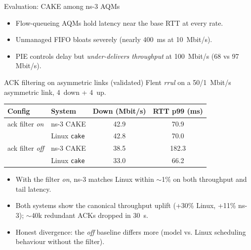 \documentclass[10pt,aspectratio=169]{beamer}
\begin{document}
\begin{frame}{Evaluation: CAKE among ns-3 AQMs}
\centering
{}
\begin{itemize}
  \item Flow-queueing AQMs hold latency near the base RTT at every rate.
  \item Unmanaged FIFO bloats severely (nearly $400$~ms at 10~Mbit/s).
  \item PIE controls delay but \emph{under-delivers throughput} at
        100~Mbit/s (68 vs 97 Mbit/s).
\end{itemize}
\end{frame}

\begin{frame}{ACK filtering on asymmetric links (validated)}
\small Flent \emph{rrul} on a 50/1~Mbit/s asymmetric link, 4~down + 4~up.
\vspace{1ex}
\centering
\begin{tabular}{@{}llcc@{}}
\toprule
Config & System & Down (Mbit/s) & RTT p99 (ms)\\
\midrule
ack filter \emph{on}  & ns-3 CAKE & 42.9 & 70.9\\
                      & Linux \texttt{cake} & 42.8 & 70.0\\
ack filter \emph{off} & ns-3 CAKE & 38.5 & 182.3\\
                      & Linux \texttt{cake} & 33.0 & 66.2\\
\bottomrule
\end{tabular}
\vspace{1ex}
\begin{itemize}
  \item With the filter \emph{on}, ns-3 matches Linux within
        \alert{$\sim$1\%} on both throughput and tail latency.
  \item Both systems show the canonical throughput uplift
        (+30\% Linux, +11\% ns-3); $\sim$40k redundant ACKs dropped in 30~s.
  \item Honest divergence: the \emph{off} baseline differs more
        (model vs. Linux scheduling behaviour without the filter).
\end{itemize}
\end{frame}
\end{document}
